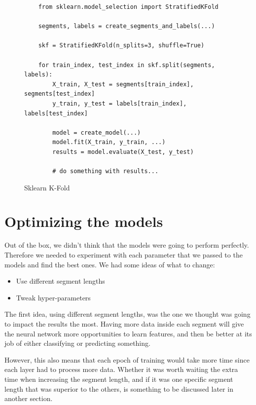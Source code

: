 \newpage

\begin{figure}
\begin{code}
    \caption{Sklearn K-Fold}
    \label{code:sklearn_k_fold}
    
    \begin{verbatim}
    from sklearn.model_selection import StratifiedKFold

    segments, labels = create_segments_and_labels(...)

    skf = StratifiedKFold(n_splits=3, shuffle=True)

    for train_index, test_index in skf.split(segments, labels):
        X_train, X_test = segments[train_index], segments[test_index]
        y_train, y_test = labels[train_index], labels[test_index]

        model = create_model(...)
        model.fit(X_train, y_train, ...)
        results = model.evaluate(X_test, y_test)

        # do something with results...

    \end{verbatim}
\end{code}
\end{figure}

\section{Optimizing the models}

\noindent Out of the box, we didn't think that the models were going to perform perfectly. Therefore we needed to experiment with each parameter that we passed to the models and find the best ones. We had some ideas of what to change:

\begin{itemize}
    \item Use different segment lengths
    \item Tweak hyper-parameters
\end{itemize}

\noindent The first idea, using different segment lengths, was the one we thought was going to impact the results the most. Having more data inside each segment will give the neural network more opportunities to learn features, and then be better at its job of either classifying or predicting something. 

However, this also means that each epoch of training would take more time since each layer had to process more data. Whether it was worth waiting the extra time when increasing the segment length, and if it was one specific segment length that was superior to the others, is something to be discussed later in another section. 

